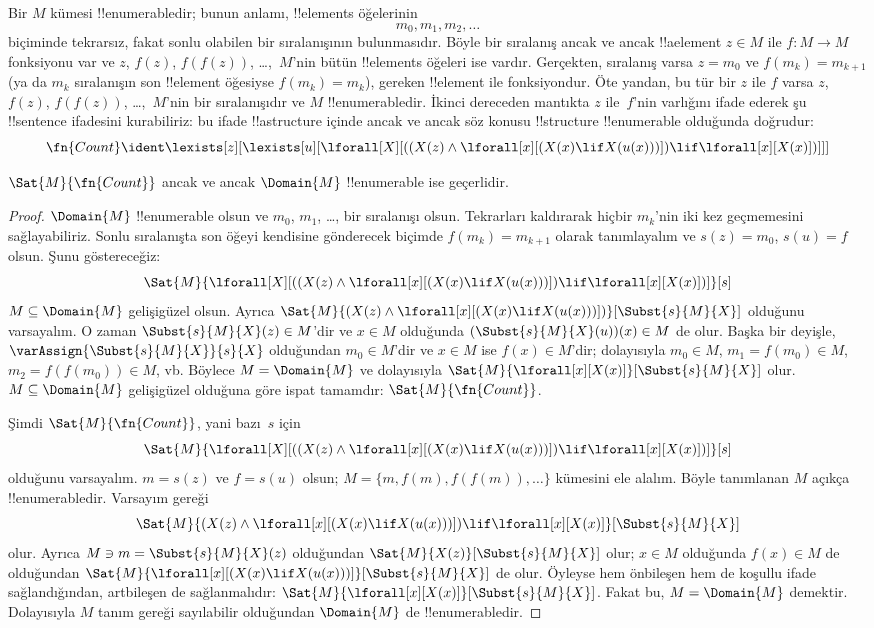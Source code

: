 Bir $M$ kümesi !!{enumerable}{}dir; bunun anlamı, !!{element}s öğelerinin
\[
m_0, m_1, m_2, \dots
\]
biçiminde tekrarsız, fakat sonlu olabilen bir sıralanışının bulunmasıdır.
Böyle bir
sıralanış ancak ve ancak !!a{element}
$z \in M$ ile $f\colon M \to M$ fonksiyonu var ve $z$, $f(z)$,
$f(f(z))$, \dots,~$M$'nin bütün !!{element}s öğeleri ise vardır.
Gerçekten, sıralanış varsa $z=m_0$ ve $f(m_k)=m_{k+1}$ (ya da $m_k$
sıralanışın son !!{element} öğesiyse $f(m_k)=m_k$), gereken !!{element}
ile fonksiyondur. Öte yandan, bu tür bir $z$ ile $f$ varsa $z$, $f(z)$,
$f(f(z))$, \dots,~$M$'nin bir sıralanışıdır ve $M$ !!{enumerable}{}dir.
İkinci dereceden mantıkta $z$ ile~$f$'nin varlığını ifade ederek şu
!!{sentence} ifadesini kurabiliriz: bu ifade !!a{structure} içinde ancak ve
ancak söz konusu !!{structure} !!{enumerable} olduğunda doğrudur:
\[
\fn{Count} \ident
\lexists[z][\lexists[u][\lforall[X][((X(z) \land
      \lforall[x][(X(x) \lif X(u(x)))]) \lif \lforall[x][X(x)])]]]
\]

\begin{prop}
$\Sat{M}{\fn{Count}}$ ancak ve ancak $\Domain{M}$ !!{enumerable} ise
geçerlidir.
\end{prop}

\begin{proof}
$\Domain{M}$ !!{enumerable} olsun ve $m_0$, $m_1$, \dots, bir sıralanışı
olsun. Tekrarları kaldırarak hiçbir $m_k$'nin iki kez geçmemesini
sağlayabiliriz. Sonlu sıralanışta son öğeyi kendisine gönderecek biçimde
$f(m_k)=m_{k+1}$ olarak tanımlayalım ve $s(z)=m_0$,
$s(u)=f$ olsun. Şunu göstereceğiz:
\[
\Sat{M}{\lforall[X][((X(z) \land \lforall[x][(X(x) \lif X(u(x)))] )
    \lif \lforall[x][X(x)])]}[s]
\]
$M \subseteq \Domain{M}$ gelişigüzel olsun. Ayrıca
$\Sat{M}{(X(z) \land \lforall[x][(X(x) \lif
X(u(x)))])}[\Subst{s}{M}{X}]$ olduğunu varsayalım. O zaman
$\Subst{s}{M}{X}(z) \in M$'dir ve $x \in M$ olduğunda
$(\Subst{s}{M}{X}(u))(x) \in M$ de olur. Başka bir deyişle,
$\varAssign{\Subst{s}{M}{X}}{s}{X}$ olduğundan $m_0 \in M$'dir ve
$x \in M$ ise $f(x) \in M$'dir; dolayısıyla $m_0 \in M$,
$m_1=f(m_0) \in M$, $m_2=f(f(m_0)) \in M$, vb. Böylece
$M=\Domain{M}$ ve dolayısıyla
$\Sat{M}{\lforall[x][X(x)]}[\Subst{s}{M}{X}]$ olur.
$M \subseteq \Domain{M}$ gelişigüzel olduğuna göre ispat tamamdır:
$\Sat{M}{\fn{Count}}$.

Şimdi $\Sat{M}{\fn{Count}}$, yani bazı~$s$ için
\[
\Sat{M}{\lforall[X][((X(z) \land \lforall[x][(X(x) \lif X(u(x)))] )
    \lif \lforall[x][X(x)])]}[s]
\]
olduğunu varsayalım. $m=s(z)$ ve $f=s(u)$ olsun;
$M=\{m,f(m),f(f(m)),\dots\}$ kümesini ele alalım. Böyle tanımlanan $M$
açıkça !!{enumerable}{}dir. Varsayım gereği
\[
\Sat{M}{(X(z) \land \lforall[x][(X(x) \lif X(u(x)))] )
    \lif \lforall[x][X(x)]}[\Subst{s}{M}{X}]
\]
olur. Ayrıca $M \ni m=\Subst{s}{M}{X}(z)$ olduğundan
$\Sat{M}{X(z)}[\Subst{s}{M}{X}]$ olur; $x \in M$ olduğunda
$f(x) \in M$ de olduğundan
$\Sat{M}{\lforall[x][(X(x) \lif X(u(x)))]}[\Subst{s}{M}{X}]$ de olur.
Öyleyse hem önbileşen hem de koşullu ifade sağlandığından, artbileşen de
sağlanmalıdır:
$\Sat{M}{\lforall[x][X(x)]}[\Subst{s}{M}{X}]$. Fakat bu,
$M=\Domain{M}$ demektir. Dolayısıyla $M$ tanım gereği sayılabilir
olduğundan $\Domain{M}$ de !!{enumerable}{}dir.
\end{proof}

